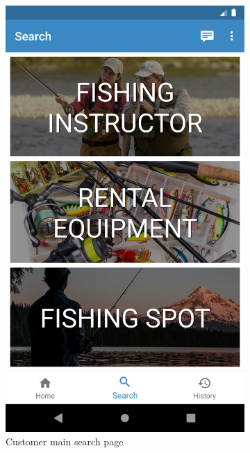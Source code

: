 \begin{samepage}
\begin{figure}[h]
\begin{subfigure}{.5\textwidth}
  \includegraphics[height=.3\textheight, keepaspectratio=true]{Img/CustomerSearch}
  \caption{Customer main search page}
\end{subfigure}%
\begin{subfigure}{.5\textwidth}
  \centering

\end{subfigure}
\end{figure}
\end{samepage}
